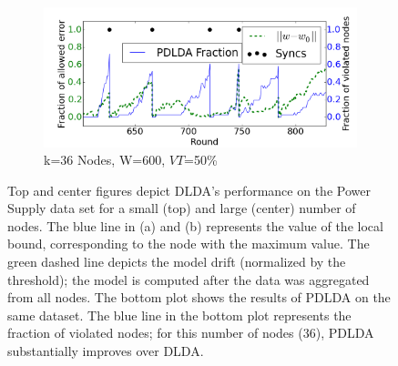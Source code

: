 \begin{figure}
    \begin{subfigure}[b]{0.5\textwidth}
        \includegraphics[width=\textwidth]{graphics/36nodesProb.png}
        \caption{k=36 Nodes, W=600, $VT$=50\%}
    \end{subfigure}
    \caption{Top and center figures depict DLDA's performance on the Power Supply data set for a small (top) and large (center) number of nodes. The blue line in (a) and (b) represents the value of the local bound, corresponding to the node with the maximum value. The green dashed line depicts the model drift (normalized by the threshold); the model is computed after the data was aggregated from all nodes. The bottom plot shows the results of PDLDA on the same dataset. The blue line in the bottom plot represents the fraction of violated nodes; for this number of nodes (36), PDLDA substantially improves over DLDA.}\label{PowerSupplyFigures}
\end{figure}
	
